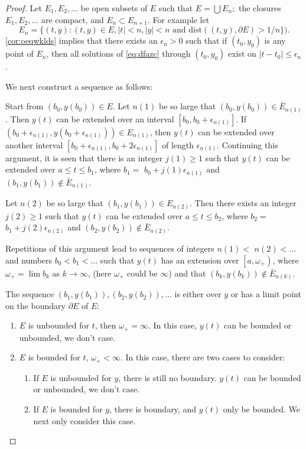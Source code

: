 \documentclass{article}
\begin{document}
\begin{proof}
Let $E_{1}, E_{2}, \ldots$ be open subsets of $E$ such that $E=\bigcup E_{n} ;$ the closures $E_{1}, E_{2}, \ldots$ are compact, and $E_{n} \subset E_{n+1}.$ For example let $$E_{n}=\{(t, y):(t, y) \in E,|t|<n,|y|<n\text{ and }\mathrm{dist}((t, y), \partial E)>1 / n\}).$$ \cref{cor:oeqwklds} implies that there exists an $\epsilon_{n}>0$ such that if $\left(t_{0}, y_{0}\right)$ is any point of $E_{n}$, then all solutions of \cref{eq:dfazc} through $\left(t_{0}, y_{0}\right)$ exist on $\left|t-t_{0}\right|\le \epsilon_{n}$.

We next construct a sequence as follows:

Start from $(b_0,y(b_0))\in E$. Let $n(1)$ be so large that $\left(b_{0}, y\left(b_{0}\right)\right) \in \bar{E}_{n(1)}$. Then $y(t)$ can be extended over an interval $\left[b_{0}, b_{0}+\epsilon_{n(1)}\right]$. If $\left(b_{0}+\epsilon_{n(1)}, y\left(b_{0}+\epsilon_{n(1)}\right)\right) \in E_{n(1)}$, then $y(t)$ can be extended over another interval $\left[b_{0}+\epsilon_{n(1)}, b_{0}+2 \epsilon_{n(1)}\right]$ of length $\epsilon_{n(1)}$. Continuing this argument, it is seen that there is an integer $j(1) \ge 1$ such that $y(t)$ can be extended over $a\le t\le b_{1}$, where $b_{1}=$ $b_{0}+j(1) \epsilon_{n(1)}$ and $\left(b_{1}, y\left(b_{1}\right)\right) \notin \bar{E}_{n(1)}$.

Let $n(2)$ be so large that $\left(b_{1}, y\left(b_{1}\right)\right) \in E_{n(2)}$. Then there exists an integer $j(2) \ge 1$ such that $y(t)$ can be extended over $a\le t\le b_{2}$, where $b_{2}=$ $b_{1}+j(2) \epsilon_{n(2)}$ and $\left(b_{2}, y\left(b_{2}\right)\right) \notin \bar{E}_{n(2)}$.

Repetitions of this argument lead to sequences of integers $n(1)<$ $n(2)<\ldots$ and numbers $b_{0}<b_{1}<\ldots$ such that $y(t)$ has an extension over $\left[a, \omega_{+}\right)$, where $\omega_{+}=\lim b_{k}$ as $k \rightarrow \infty$, (here $\omega_{+}$ could be $\infty$) and that $\left(b_{k}, y\left(b_{k}\right)\right) \notin \bar{E}_{n(k)} .$ 

The sequence $\left(b_{1}, y\left(b_{1}\right)\right),\left(b_{2}, y\left(b_{2}\right)\right), \ldots$ is either  over $y$ or has a limit point on the boundary $\partial E$ of $E$:
\begin{enumerate}
    \item  $E$ is unbounded for $t$, then $\omega_{+}=\infty$. In this case, $y(t)$ can be bounded or unbounded, we don't case.
    \item  $E$ is bounded for $t$, $\omega_{+}<\infty$. In this case, there are two cases to consider:
    \begin{enumerate}
        \item If $E$ is unbounded for $y$, there  is still no boundary. $y(t)$ can be bounded or unbounded, we don't case.
        \item If $E$ is bounded for $y$, there is boundary, and $y(t)$ only be bounded. We next only consider this case.
    \end{enumerate}
\end{enumerate}



\end{proof}
\end{document}
